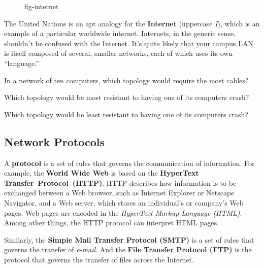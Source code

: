 \begin{figure}[thb]
 {fig-internet}
\end{figure}


The United Nations is an apt analogy for the {\bf Internet}
(uppercase {\it I}), which is an example of a  particular  worldwide
internet.  Internets, in the generic sense, shouldn't be confused
with the Internet.   It's quite likely that your campus LAN is
itself composed of several, smaller networks, each of
which uses its own ``language.''

\pagebreak
{}
\begin{SSTUDY}
\item  In a network of ten computers, which topology would require the
most cables?

\item  Which topology would be most resistant to having one of
its computers crash?

\item  Which topology would be least resistant to having one of
its computers crash?
\end{SSTUDY}


\subsection{Network Protocols}
\noindent A {\bf protocol} is a set of rules that governs the communication of
information.  For example, the {\bf World Wide Web }is based on the {\bf
HyperText} \mbox{\bf Transfer Protocol (HTTP)}. HTTP describes how information is
to be exchanged between a Web browser, such as Internet Explorer or
Netscape Navigator, and a Web server, which stores an individual's or
company's Web pages.  Web pages are encoded in the {\it HyperText
Markup Language (HTML)}. Among other things, the HTTP protocol can
interpret HTML pages.

Similarly, the {\bf Simple Mail Transfer Protocol (SMTP)} is a set of
rules that governs the transfer of {\it e-mail}. And the {\bf File
Transfer Protocol (FTP)} is the protocol that governs the transfer of
files across the Internet.

